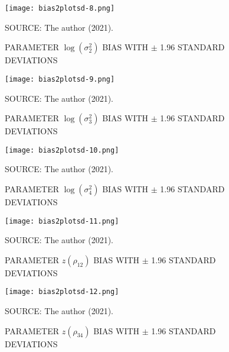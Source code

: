 \begin{figure}[H]
 \setlength{\abovecaptionskip}{.0001pt}
 \caption{PARAMETER \(\log(\sigma_{2}^{2})\) BIAS WITH \(\pm\) 1.96
          STANDARD DEVIATIONS}
 \vspace{0.2cm}\centering
 \texttt{[image: bias2plotsd-8.png]}\\
 \begin{footnotesize}
  SOURCE: The author (2021).
 \end{footnotesize}
 \label{fig:biassdlogs2_2}
\end{figure}

\begin{figure}[H]
 \setlength{\abovecaptionskip}{.0001pt}
 \caption{PARAMETER \(\log(\sigma_{3}^{2})\) BIAS WITH \(\pm\) 1.96
          STANDARD DEVIATIONS}
 \vspace{0.2cm}\centering
 \texttt{[image: bias2plotsd-9.png]}\\
 \begin{footnotesize}
  SOURCE: The author (2021).
 \end{footnotesize}
 \label{fig:biassdlogs2_3}
\end{figure}

\begin{figure}[H]
 \setlength{\abovecaptionskip}{.0001pt}
 \caption{PARAMETER \(\log(\sigma_{4}^{2})\) BIAS WITH \(\pm\) 1.96
          STANDARD DEVIATIONS}
 \vspace{0.2cm}\centering
 \texttt{[image: bias2plotsd-10.png]}\\
 \begin{footnotesize}
  SOURCE: The author (2021).
 \end{footnotesize}
 \label{fig:biassdlogs2_4}
\end{figure}

\begin{figure}[H]
 \setlength{\abovecaptionskip}{.0001pt}
 \caption{PARAMETER \(z(\rho_{12})\) BIAS WITH \(\pm\) 1.96 STANDARD
          DEVIATIONS}
 \vspace{0.2cm}\centering
 \texttt{[image: bias2plotsd-11.png]}\\
 \begin{footnotesize}
  SOURCE: The author (2021).
 \end{footnotesize}
 \label{fig:biassdrhoz12}
\end{figure}

\begin{figure}[H]
 \setlength{\abovecaptionskip}{.0001pt}
 \caption{PARAMETER \(z(\rho_{34})\) BIAS WITH \(\pm\) 1.96 STANDARD
          DEVIATIONS}
 \vspace{0.2cm}\centering
 \texttt{[image: bias2plotsd-12.png]}\\
 \begin{footnotesize}
  SOURCE: The author (2021).
 \end{footnotesize}
 \label{fig:biassdrhoz34}
\end{figure}

